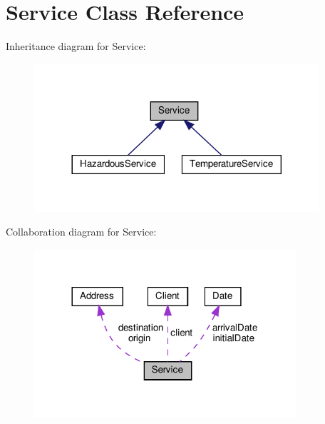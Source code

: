 \hypertarget{class_service}{}\section{Service Class Reference}
\label{class_service}


Inheritance diagram for Service\+:\nopagebreak
\begin{figure}[H]
\begin{center}
\leavevmode
\includegraphics[width=300pt]{class_service__inherit__graph}
\end{center}
\end{figure}


Collaboration diagram for Service\+:
\nopagebreak
\begin{figure}[H]
\begin{center}
\leavevmode
\includegraphics[width=276pt]{class_service__coll__graph}
\end{center}
\end{figure}
